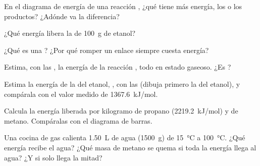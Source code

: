 \begin{exercise}[$\star$]\label{exo:g11:reaction-energy:3}
En el diagrama de energía de una reacción , ¿qué tiene más
energía, los  o los productos? ¿Adónde va la diferencia?
\end{exercise}

\begin{exercise}[$\star$]\label{exo:g11:reaction-energy:4}
¿Qué energía libera la  de \qty{100}{g} de etanol?
\end{exercise}

\begin{exercise}[$\star$]\label{exo:g11:reaction-energy:5}
¿Qué es una ? ¿Por qué romper un enlace siempre cuesta
energía?
\end{exercise}

\begin{exercise}[$\star\star$]\label{exo:g11:reaction-energy:6}
Estima, con las , la energía de la reacción
, todo en estado gaseoso. ¿Es ?
\end{exercise}

\begin{exercise}[$\star\star$]\label{exo:g11:reaction-energy:7}
Estima la energía de la  del etanol, , con las  (dibuja primero la  del etanol), y compárala con el valor medido de
\qty{1367.6}{kJ/mol}.
\end{exercise}

\begin{exercise}[$\star\star$]\label{exo:g11:reaction-energy:8}
Calcula la energía liberada por kilogramo de propano
(\qty{2219.2}{kJ/mol}) y de metano. Compáralas con el diagrama de
barras.
\end{exercise}

\begin{exercise}[$\star\star$]\label{exo:g11:reaction-energy:9}
Una cocina de gas calienta \qty{1.50}{L} de agua (\qty{1500}{g}) de
\qty{15}{\celsius} a \qty{100}{\celsius}. ¿Qué energía recibe el agua?
¿Qué masa de metano se quema si toda la energía llega al agua? ¿Y si
solo llega la mitad?
\end{exercise}

